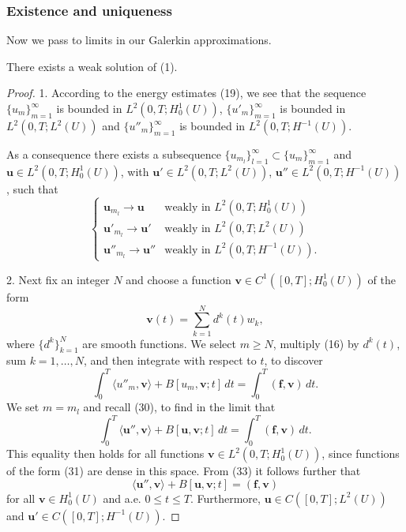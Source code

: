 \subsubsection{Existence and uniqueness}

Now we pass to limits in our Galerkin approximations.

\begin{theorem}
\label{thm:hyperbolic-existence-weak-solution}
There exists a weak solution of (1).
\end{theorem}

\begin{proof}
1. According to the energy estimates (19), we see that the sequence $\{u_m\}_{m=1}^{\infty}$ is bounded in $L^2(0,T;H_0^1(U))$, $\{u'_m\}_{m=1}^{\infty}$ is bounded in $L^2(0,T;L^2(U))$ and $\{u''_m\}_{m=1}^{\infty}$ is bounded in $L^2(0,T;H^{-1}(U))$.

As a consequence there exists a subsequence $\{u_{m_l}\}_{l=1}^{\infty} \subset \{u_m\}_{m=1}^{\infty}$ and $\mathbf{u} \in L^2(0,T;H_0^1(U))$, with $\mathbf{u}' \in L^2(0,T;L^2(U))$, $\mathbf{u}'' \in L^2(0,T;H^{-1}(U))$, such that
\[
\begin{cases}
\mathbf{u}_{m_l} \to \mathbf{u} & \text{weakly in } L^2(0,T;H_0^1(U)) \\
\mathbf{u}'_{m_l} \to \mathbf{u}' & \text{weakly in } L^2(0,T;L^2(U)) \\
\mathbf{u}''_{m_l} \to \mathbf{u}'' & \text{weakly in } L^2(0,T;H^{-1}(U)).
\end{cases} \tag{30}
\]

2. Next fix an integer $N$ and choose a function $\mathbf{v} \in C^1([0,T];H_0^1(U))$ of the form
\[
\mathbf{v}(t) = \sum_{k=1}^{N} d^k(t)w_k, \tag{31}
\]
where $\{d^k\}_{k=1}^{N}$ are smooth functions. We select $m \geq N$, multiply (16) by $d^k(t)$, sum $k = 1, \ldots, N$, and then integrate with respect to $t$, to discover
\[
\int_0^T \langle u''_m, \mathbf{v} \rangle + B[u_m, \mathbf{v}; t] \, dt = \int_0^T (\mathbf{f}, \mathbf{v}) \, dt. \tag{32}
\]
We set $m = m_l$ and recall (30), to find in the limit that
\[
\int_0^T \langle \mathbf{u}'', \mathbf{v} \rangle + B[\mathbf{u}, \mathbf{v}; t] \, dt = \int_0^T (\mathbf{f}, \mathbf{v}) \, dt. \tag{33}
\]
This equality then holds for all functions $\mathbf{v} \in L^2(0,T;H_0^1(U))$, since functions of the form (31) are dense in this space. From (33) it follows further that
\[
\langle \mathbf{u}'', \mathbf{v} \rangle + B[\mathbf{u}, \mathbf{v}; t] = (\mathbf{f}, \mathbf{v})
\]
for all $\mathbf{v} \in H_0^1(U)$ and a.e. $0 \leq t \leq T$. Furthermore, $\mathbf{u} \in C([0,T];L^2(U))$ and $\mathbf{u}' \in C([0,T];H^{-1}(U))$.


\end{proof}
